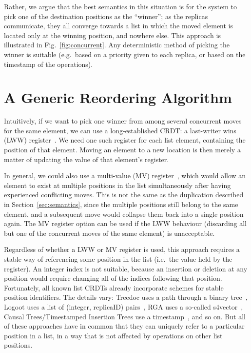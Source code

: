 \documentclass[sigplan,10pt]{acmart}
\begin{document}
Rather, we argue that the best semantics in this situation is for the system to pick one of the destination positions as the ``winner''; as the replicas communicate, they all converge towards a list in which the moved element is located only at the winning position, and nowhere else.
This approach is illustrated in Fig.~\ref{fig:concurrent}.
Any deterministic method of picking the winner is suitable (e.g.\ based on a priority given to each replica, or based on the timestamp of the operations).

\section{A Generic Reordering Algorithm}\label{sec:algorithm}

Intuitively, if we want to pick one winner from among several concurrent moves for the same element, we can use a long-established CRDT: a last-writer wins (LWW) register~\cite{Shapiro:2011wy,Johnson:1975we}.
We need one such register for each list element, containing the position of that element.
Moving an element to a new location is then merely a matter of updating the value of that element's register.

In general, we could also use a multi-value (MV) register~\cite{Shapiro:2011wy}, which would allow an element to exist at multiple positions in the list simultaneously after having experienced conflicting moves.
This is not the same as the duplication described in Section~\ref{sec:semantics}, since the multiple positions still belong to the same element, and a subsequent move would collapse them back into a single position again.
The MV register option can be used if the LWW behaviour (discarding all but one of the concurrent moves of the same element) is unacceptable.

Regardless of whether a LWW or MV register is used, this approach requires a stable way of referencing some position in the list (i.e.\ the value held by the register).
An integer index is not suitable, because an insertion or deletion at any position would require changing all of the indices following that position.
Fortunately, all known list CRDTs already incorporate schemes for stable position identifiers.
The details vary: Treedoc uses a path through a binary tree~\cite{Preguica:2009fz}, Logoot uses a list of (integer, replicaID) pairs~\cite{Weiss:2009ht}, RGA uses a so-called s4vector~\cite{Roh:2011dw}, Causal Trees/Timestamped Insertion Trees use a timestamp~\cite{Grishchenko:2014eh,Attiya:2016kh}, and so on.
But all of these approaches have in common that they can uniquely refer to a particular position in a list, in a way that is not affected by operations on other list positions.
\end{document}
